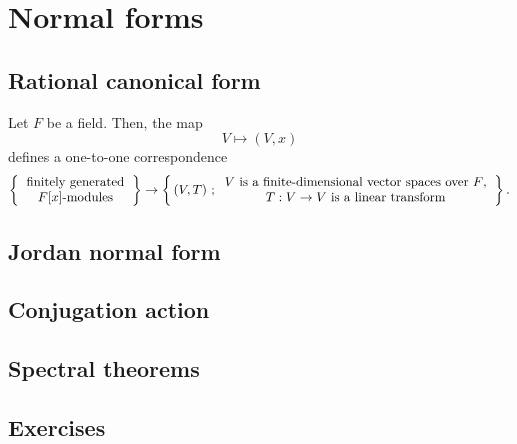 \documentclass{../../large}
\begin{document}
\chapter{Normal forms}
\section{Rational canonical form}
\begin{prb}
Let $F$ be a field.
Then, the map
\[V\mapsto(V,x)\]
defines a one-to-one correspondence
\[\left\{\begin{tabular}{c}finitely generated\\$F[x]$-modules\end{tabular}\right\}\to\left\{\,(V,T)\ ;\begin{tabular}{c}$V$ is a finite-dimensional vector spaces over $F$,\\$T:V\to V$ is a linear transform\end{tabular}\right\}.\]
\end{prb}
\begin{prb}
\end{prb}

\section{Jordan normal form}


\section{Conjugation action}
\begin{prb}
\end{prb}

\begin{prb}
\end{prb}

\section{Spectral theorems}

\section*{Exercises}
\end{document}

